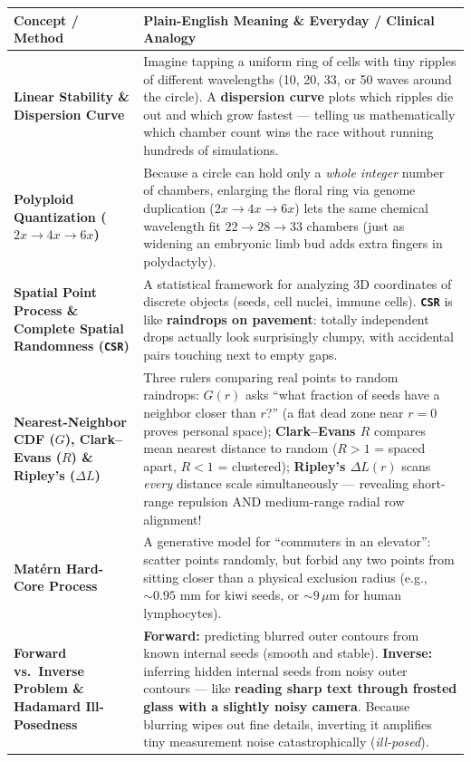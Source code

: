 \documentclass[10.5pt,a4paper]{article}
\begin{document}
\begin{table}[H]
\centering
\scriptsize
\renewcommand{\arraystretch}{1.18}
\begin{tabularx}{\textwidth}{L{3.55cm} Y}
\toprule
{}
\textbf{Concept / Method} & \textbf{Plain-English Meaning \& Everyday / Clinical Analogy} \\
\midrule
\textbf{Linear Stability \& Dispersion Curve} & Imagine tapping a uniform ring of cells with tiny ripples of different wavelengths (10, 20, 33, or 50 waves around the circle). A \textbf{dispersion curve} plots which ripples die out and which grow fastest --- telling us mathematically which chamber count wins the race without running hundreds of simulations. \\
\textbf{Polyploid Quantization ($2x \to 4x \to 6x$)} & Because a circle can hold only a \emph{whole integer} number of chambers, enlarging the floral ring via genome duplication ($2x \to 4x \to 6x$) lets the same chemical wavelength fit $22 \to 28 \to 33$ chambers (just as widening an embryonic limb bud adds extra fingers in polydactyly). \\
\textbf{Spatial Point Process \& Complete Spatial Randomness (\texttt{CSR})} & A statistical framework for analyzing 3D coordinates of discrete objects (seeds, cell nuclei, immune cells). \textbf{\texttt{CSR}} is like \textbf{raindrops on pavement}: totally independent drops actually look surprisingly clumpy, with accidental pairs touching next to empty gaps. \\
\textbf{Nearest-Neighbor CDF ($G$), Clark--Evans ($R$) \& Ripley's ($\Delta L$)} & Three rulers comparing real points to random raindrops: \textbf{$G(r)$} asks ``what fraction of seeds have a neighbor closer than $r$?'' (a flat dead zone near $r=0$ proves personal space); \textbf{Clark--Evans $R$} compares mean nearest distance to random ($R>1$ = spaced apart, $R<1$ = clustered); \textbf{Ripley's $\Delta L(r)$} scans \emph{every} distance scale simultaneously --- revealing short-range repulsion AND medium-range radial row alignment! \\
\textbf{Mat\'ern Hard-Core Process} & A generative model for ``commuters in an elevator'': scatter points randomly, but forbid any two points from sitting closer than a physical exclusion radius (e.g., $\sim 0.95\text{ mm}$ for kiwi seeds, or $\sim 9\,\mu\text{m}$ for human lymphocytes). \\
\textbf{Forward vs.\ Inverse Problem \& Hadamard Ill-Posedness} & \textbf{Forward:} predicting blurred outer contours from known internal seeds (smooth and stable). \textbf{Inverse:} inferring hidden internal seeds from noisy outer contours --- like \textbf{reading sharp text through frosted glass with a slightly noisy camera}. Because blurring wipes out fine details, inverting it amplifies tiny measurement noise catastrophically (\emph{ill-posed}). \\

\end{tabularx}
\end{table}
\end{document}
